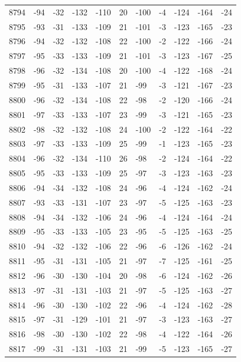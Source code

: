 \begin{table}[H]
\begin{tabular}{lllllllllll}
8794 & -94 & -32 & -132 & -110 & 20 & -100 & -4 & -124 & -164 & -24 \\
8795 & -93 & -31 & -133 & -109 & 21 & -101 & -3 & -123 & -165 & -23 \\
8796 & -94 & -32 & -132 & -108 & 22 & -100 & -2 & -122 & -166 & -24 \\
8797 & -95 & -33 & -133 & -109 & 21 & -101 & -3 & -123 & -167 & -25 \\
8798 & -96 & -32 & -134 & -108 & 20 & -100 & -4 & -122 & -168 & -24 \\
8799 & -95 & -31 & -133 & -107 & 21 & -99 & -3 & -121 & -167 & -23 \\
8800 & -96 & -32 & -134 & -108 & 22 & -98 & -2 & -120 & -166 & -24 \\
8801 & -97 & -33 & -133 & -107 & 23 & -99 & -3 & -121 & -165 & -23 \\
8802 & -98 & -32 & -132 & -108 & 24 & -100 & -2 & -122 & -164 & -22 \\
8803 & -97 & -33 & -133 & -109 & 25 & -99 & -1 & -123 & -165 & -23 \\
8804 & -96 & -32 & -134 & -110 & 26 & -98 & -2 & -124 & -164 & -22 \\
8805 & -95 & -33 & -133 & -109 & 25 & -97 & -3 & -123 & -163 & -23 \\
8806 & -94 & -34 & -132 & -108 & 24 & -96 & -4 & -124 & -162 & -24 \\
8807 & -93 & -33 & -131 & -107 & 23 & -97 & -5 & -125 & -163 & -23 \\
8808 & -94 & -34 & -132 & -106 & 24 & -96 & -4 & -124 & -164 & -24 \\
8809 & -95 & -33 & -133 & -105 & 23 & -95 & -5 & -125 & -163 & -25 \\
8810 & -94 & -32 & -132 & -106 & 22 & -96 & -6 & -126 & -162 & -24 \\
8811 & -95 & -31 & -131 & -105 & 21 & -97 & -7 & -125 & -161 & -25 \\
8812 & -96 & -30 & -130 & -104 & 20 & -98 & -6 & -124 & -162 & -26 \\
8813 & -97 & -31 & -131 & -103 & 21 & -97 & -5 & -125 & -163 & -27 \\
8814 & -96 & -30 & -130 & -102 & 22 & -96 & -4 & -124 & -162 & -28 \\
8815 & -97 & -31 & -129 & -101 & 21 & -97 & -3 & -123 & -163 & -27 \\
8816 & -98 & -30 & -130 & -102 & 22 & -98 & -4 & -122 & -164 & -26 \\
8817 & -99 & -31 & -131 & -103 & 21 & -99 & -5 & -123 & -165 & -27 \\

\end{tabular}
\end{table}

